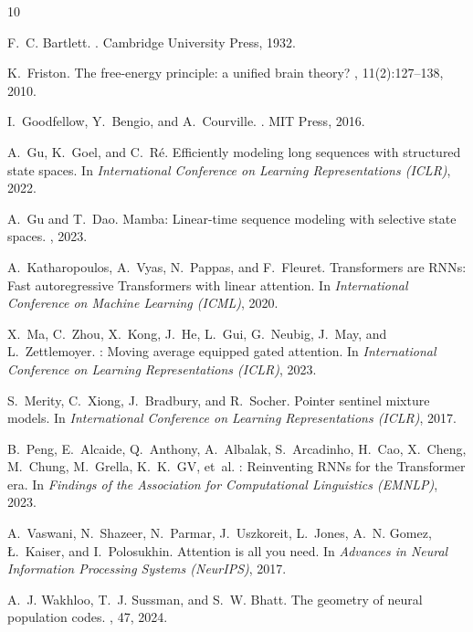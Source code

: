 \documentclass[11pt]{article}
\begin{document}
\begin{thebibliography}{10}

F.~C. Bartlett.
.
\newblock Cambridge University Press, 1932.

K.~Friston.
\newblock The free-energy principle: a unified brain theory?
, 11(2):127--138, 2010.

I.~Goodfellow, Y.~Bengio, and A.~Courville.
.
\newblock MIT Press, 2016.

A.~Gu, K.~Goel, and C.~R{\'e}.
\newblock Efficiently modeling long sequences with structured state spaces.
\newblock In {\em International Conference on Learning Representations (ICLR)}, 2022.

A.~Gu and T.~Dao.
\newblock Mamba: Linear-time sequence modeling with selective state spaces.
, 2023.

A.~Katharopoulos, A.~Vyas, N.~Pappas, and F.~Fleuret.
\newblock Transformers are {RNN}s: Fast autoregressive {T}ransformers with linear attention.
\newblock In {\em International Conference on Machine Learning (ICML)}, 2020.

X.~Ma, C.~Zhou, X.~Kong, J.~He, L.~Gui, G.~Neubig, J.~May, and L.~Zettlemoyer.
: Moving average equipped gated attention.
\newblock In {\em International Conference on Learning Representations (ICLR)}, 2023.

S.~Merity, C.~Xiong, J.~Bradbury, and R.~Socher.
\newblock Pointer sentinel mixture models.
\newblock In {\em International Conference on Learning Representations (ICLR)}, 2017.

B.~Peng, E.~Alcaide, Q.~Anthony, A.~Albalak, S.~Arcadinho, H.~Cao, X.~Cheng, M.~Chung, M.~Grella, K.~K.~GV, et~al.
: Reinventing {RNN}s for the {T}ransformer era.
\newblock In {\em Findings of the Association for Computational Linguistics (EMNLP)}, 2023.

A.~Vaswani, N.~Shazeer, N.~Parmar, J.~Uszkoreit, L.~Jones, A.~N. Gomez, {\L}.~Kaiser, and I.~Polosukhin.
\newblock Attention is all you need.
\newblock In {\em Advances in Neural Information Processing Systems (NeurIPS)}, 2017.

A.~J. Wakhloo, T.~J. Sussman, and S.~W. Bhatt.
\newblock The geometry of neural population codes.
, 47, 2024.

\end{thebibliography}
\end{document}
